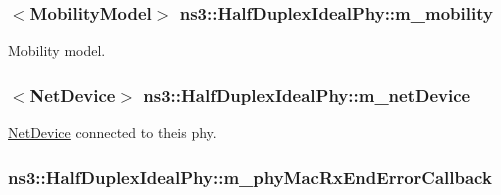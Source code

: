 \subsubsection[{\texorpdfstring{m\+\_\+mobility}{m_mobility}}]{$<${\bf Mobility\+Model}$>$ ns3\+::\+Half\+Duplex\+Ideal\+Phy\+::m\+\_\+mobility\hspace{0.3cm}{\ttfamily [private]}}\hypertarget{classns3_1_1HalfDuplexIdealPhy_a4473d14e6f2ff9983cb9c5eee0b52fe7}{}\label{classns3_1_1HalfDuplexIdealPhy_a4473d14e6f2ff9983cb9c5eee0b52fe7}


Mobility model. 

\subsubsection[{\texorpdfstring{m\+\_\+net\+Device}{m_netDevice}}]{$<${\bf Net\+Device}$>$ ns3\+::\+Half\+Duplex\+Ideal\+Phy\+::m\+\_\+net\+Device\hspace{0.3cm}{\ttfamily [private]}}\hypertarget{classns3_1_1HalfDuplexIdealPhy_aaa6f5f1e7154d0cd2aada4fd79cdddda}{}\label{classns3_1_1HalfDuplexIdealPhy_aaa6f5f1e7154d0cd2aada4fd79cdddda}


\hyperlink{classns3_1_1NetDevice}{Net\+Device} connected to theis phy. 

\subsubsection[{\texorpdfstring{m\+\_\+phy\+Mac\+Rx\+End\+Error\+Callback}{m_phyMacRxEndErrorCallback}}]{ ns3\+::\+Half\+Duplex\+Ideal\+Phy\+::m\+\_\+phy\+Mac\+Rx\+End\+Error\+Callback\hspace{0.3cm}{\ttfamily [private]}}\hypertarget{classns3_1_1HalfDuplexIdealPhy_aa3c7a178ca01aa7ac1408249c9fef3f2}{}\label{classns3_1_1HalfDuplexIdealPhy_aa3c7a178ca01aa7ac1408249c9fef3f2}


